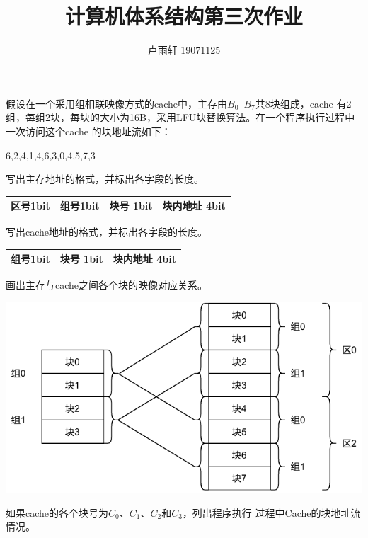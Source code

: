 \documentclass{ctexart}
\title{计算机体系结构第三次作业}
\author{卢雨轩 19071125}
\begin{document}
\maketitle

\begin{outline}[enumerate]
    \1[3-14] 假设在一个采用组相联映像方式的cache中，主存由$B_0$~$B_7$共8块组成，cache
    有2组，每组2块，每块的大小为16B，采用LFU块替换算法。在一个程序执行过程中一次访问这个cache
    的块地址流如下：
    \begin{center}
        6,2,4,1,4,6,3,0,4,5,7,3
    \end{center}
    \2 写出主存地址的格式，并标出各字段的长度。
    \begin{center}
        \begin{tabular}{|x{3cm}|x{3cm}|x{3cm}|x{3cm}|}
            \hline
            区号1bit & 组号1bit & 块号 1bit & 块内地址 4bit \\
            \hline
        \end{tabular}
    \end{center}
    \2 写出cache地址的格式，并标出各字段的长度。
    \begin{center}
        \begin{tabular}{|x{3cm}|x{3cm}|x{3cm}|}
            \hline
            组号1bit & 块号 1bit & 块内地址 4bit \\
            \hline
        \end{tabular}
    \end{center}
    \2 画出主存与cache之间各个块的映像对应关系。
    \begin{center}
        \includegraphics{homework 3 cache.drawio.pdf}
    \end{center}
    \2 如果cache的各个块号为$C_0$、$C_1$、$C_2$和$C_3$，列出程序执行
    过程中Cache的块地址流情况。
    \begin{center}
        \begin{tabular}{c|c|c|c|c|c|c|c|c|c|c|c|c|}

\end{tabular}
\end{center}
\end{outline}
\end{document}
